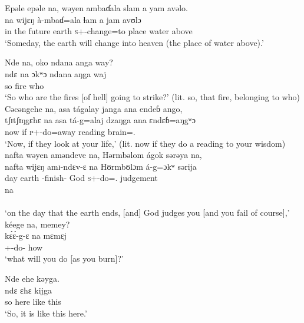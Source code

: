 \ea Epəle epəle  na,  wəyen  ambaɗala  slam  a  yam  avəlo.\\
    na   wijɛŋ   à-mbaɗ=ala   ɬam   a   jam   avʊlɔ\\ 
 {in the future}  {\PSP}  earth  \textsc{s}+{\PFV}-change=to    place  {\GEN}  water  above\\
 \glt ‘Someday, the earth will change into heaven (the place of water above).’ 
 \z

\ea Nde  na,  oko  ndana  anga  way?\\
 \gll ndɛ  na   ɔkʷɔ   ndana   aŋga   waj\\
 so  {\PSP}  fire  {\DEM}  {\POSS}  who\\
 \glt ‘So who are the fires [of hell] going to strike?’ (lit. so, that fire, belonging to who)
 \z
\clearpage
\ea Cəcəngehe  na,  asa  tágalay  janga  ana  endeɓ  ango,      \\
 \gll tʃɪtʃɪŋgɛhɛ    na  asa  tá-g=alaj      dzaŋga   ana    ɛndɛɓ=aŋgʷɔ\\
 now            {\PSP}    if     \textsc{p}+{\IFV}-do=away  reading  {\DAT}   brain={\twoS}.{\POSS}  \\
 \glt ‘Now, if they look at your life,’ (lit. now if they do a reading to your wisdom)\\
 
 \medskip
   nafta  wəyen  aməndeve  na,  Hərmbəlom  ágok  sərəya  na,\\
 \gll nafta   wijɛŋ  amɪ-ndɛv-ɛ  na  Hʊrmbʊlɔm  á-g=ɔkʷ sərija  \\ 
 day     earth    {\DEP}-finish-{\CL}   {\PSP}    God           \textsc{s}+{\IFV}-do={\twoS}.{\IO}   judgement  \\  
   
 \medskip
 \gll na\\
      {\PSP} \\
 \glt ‘on the day that the earth ends, [and] God judges you [and you fail of course],’\\

 \medskip
  kéege  na,  memey?\\
 \gll k\'ɛ\'ɛ-g-ɛ    na  mɛmɛj\\
 {\twoS}+{\POT}-do-{\CL}  {\PSP}  how\\
 \glt ‘what will you do [as you burn]?’
 \z


\ea Nde  ehe  kəyga.\\
 \gll ndɛ  ɛhɛ   kijga\\
 so  here  {like this}\\
 \glt ‘So, it is like this here.’ 
 \z

